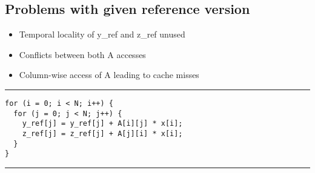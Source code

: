 \documentclass[a4paper]{article}
\begin{document}
\subsection{Problems with given reference version}
\begin{minipage}{0.5\textwidth}
\begin{itemize}
\item Temporal locality of y\_ref and z\_ref unused
\item Conflicts between both A accesses
\item Column-wise access of A leading to cache misses
\end{itemize}
\end{minipage}
\begin{minipage}{0.5\textwidth}
\hrule
\begin{lstlisting}
for (i = 0; i < N; i++) {
  for (j = 0; j < N; j++) {
    y_ref[j] = y_ref[j] + A[i][j] * x[i];
    z_ref[j] = z_ref[j] + A[j][i] * x[i];
  }
}
\end{lstlisting}
\hrule 
\end{minipage}
\vspace{0.2cm}
\end{document}
